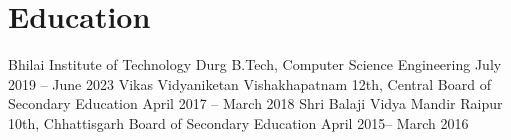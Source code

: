 
\section{{\textcolor{mainHeading}{Education}}}
  \resumeSubHeadingListStart
    \resumeSubheading
      {Bhilai Institute of Technology} {Durg}
      {B.Tech, Computer Science Engineering}
      {July 2019 -- June 2023}
    \resumeSubheading
      {Vikas Vidyaniketan} {Vishakhapatnam}
      {12th, Central Board of Secondary Education}
      {April 2017 -- March 2018}
    \resumeSubheading
      {Shri Balaji Vidya Mandir} {Raipur}
      {10th, Chhattisgarh Board of Secondary Education}
      {April 2015-- March 2016}
  \resumeSubHeadingListEnd